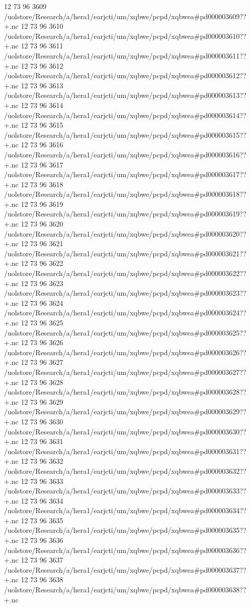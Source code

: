 12 73 96
3609
/uolstore/Research/a/hera1/earjcti/um/xqbwe/pcpd/xqbwea#pd000003609??+.nc
12 73 96
3610
/uolstore/Research/a/hera1/earjcti/um/xqbwe/pcpd/xqbwea#pd000003610??+.nc
12 73 96
3611
/uolstore/Research/a/hera1/earjcti/um/xqbwe/pcpd/xqbwea#pd000003611??+.nc
12 73 96
3612
/uolstore/Research/a/hera1/earjcti/um/xqbwe/pcpd/xqbwea#pd000003612??+.nc
12 73 96
3613
/uolstore/Research/a/hera1/earjcti/um/xqbwe/pcpd/xqbwea#pd000003613??+.nc
12 73 96
3614
/uolstore/Research/a/hera1/earjcti/um/xqbwe/pcpd/xqbwea#pd000003614??+.nc
12 73 96
3615
/uolstore/Research/a/hera1/earjcti/um/xqbwe/pcpd/xqbwea#pd000003615??+.nc
12 73 96
3616
/uolstore/Research/a/hera1/earjcti/um/xqbwe/pcpd/xqbwea#pd000003616??+.nc
12 73 96
3617
/uolstore/Research/a/hera1/earjcti/um/xqbwe/pcpd/xqbwea#pd000003617??+.nc
12 73 96
3618
/uolstore/Research/a/hera1/earjcti/um/xqbwe/pcpd/xqbwea#pd000003618??+.nc
12 73 96
3619
/uolstore/Research/a/hera1/earjcti/um/xqbwe/pcpd/xqbwea#pd000003619??+.nc
12 73 96
3620
/uolstore/Research/a/hera1/earjcti/um/xqbwe/pcpd/xqbwea#pd000003620??+.nc
12 73 96
3621
/uolstore/Research/a/hera1/earjcti/um/xqbwe/pcpd/xqbwea#pd000003621??+.nc
12 73 96
3622
/uolstore/Research/a/hera1/earjcti/um/xqbwe/pcpd/xqbwea#pd000003622??+.nc
12 73 96
3623
/uolstore/Research/a/hera1/earjcti/um/xqbwe/pcpd/xqbwea#pd000003623??+.nc
12 73 96
3624
/uolstore/Research/a/hera1/earjcti/um/xqbwe/pcpd/xqbwea#pd000003624??+.nc
12 73 96
3625
/uolstore/Research/a/hera1/earjcti/um/xqbwe/pcpd/xqbwea#pd000003625??+.nc
12 73 96
3626
/uolstore/Research/a/hera1/earjcti/um/xqbwe/pcpd/xqbwea#pd000003626??+.nc
12 73 96
3627
/uolstore/Research/a/hera1/earjcti/um/xqbwe/pcpd/xqbwea#pd000003627??+.nc
12 73 96
3628
/uolstore/Research/a/hera1/earjcti/um/xqbwe/pcpd/xqbwea#pd000003628??+.nc
12 73 96
3629
/uolstore/Research/a/hera1/earjcti/um/xqbwe/pcpd/xqbwea#pd000003629??+.nc
12 73 96
3630
/uolstore/Research/a/hera1/earjcti/um/xqbwe/pcpd/xqbwea#pd000003630??+.nc
12 73 96
3631
/uolstore/Research/a/hera1/earjcti/um/xqbwe/pcpd/xqbwea#pd000003631??+.nc
12 73 96
3632
/uolstore/Research/a/hera1/earjcti/um/xqbwe/pcpd/xqbwea#pd000003632??+.nc
12 73 96
3633
/uolstore/Research/a/hera1/earjcti/um/xqbwe/pcpd/xqbwea#pd000003633??+.nc
12 73 96
3634
/uolstore/Research/a/hera1/earjcti/um/xqbwe/pcpd/xqbwea#pd000003634??+.nc
12 73 96
3635
/uolstore/Research/a/hera1/earjcti/um/xqbwe/pcpd/xqbwea#pd000003635??+.nc
12 73 96
3636
/uolstore/Research/a/hera1/earjcti/um/xqbwe/pcpd/xqbwea#pd000003636??+.nc
12 73 96
3637
/uolstore/Research/a/hera1/earjcti/um/xqbwe/pcpd/xqbwea#pd000003637??+.nc
12 73 96
3638
/uolstore/Research/a/hera1/earjcti/um/xqbwe/pcpd/xqbwea#pd000003638??+.nc
